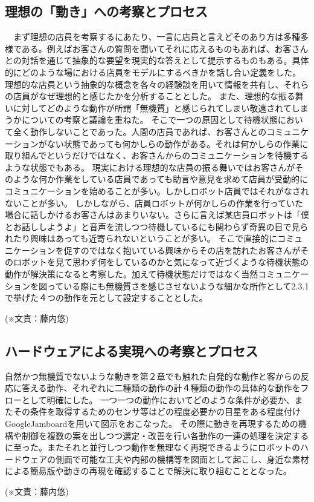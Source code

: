 \subsection{理想の「動き」への考察とプロセス}
　まず理想の店員を考察するにあたり、一言に店員と言えどそのあり方は多種多様である。例えばお客さんの質問を聞いてそれに応えるものもあれば、お客さんとの対話を通じて抽象的な要望を現実的な答えとして提示するものもある。具体的にどのような場における店員をモデルにするべきかを話し合い定義をした。
理想的な店員という抽象的な概念を各々の経験談を用いて情報を共有し、それらの店員がなぜ理想的と感じたかを分析することとした。
また、理想的な振る舞いに対してどのような動作が所謂「無機質」と感じられてしまい敬遠されてしまうかについての考察と議論を重ねた。
そこで一つの原因として待機状態において全く動作しないことであった。人間の店員であれば、お客さんとのコミュニケーションがない状態であっても何かしらの動作がある。それは何かしらの作業に取り組んでというだけではなく、お客さんからのコミュニケーションを待機するような状態でもある。
現実における理想的な店員の振る舞いではお客さんがそのような何か作業をしている店員であっても助言や意見を求めて店員が受動的にコミュニケーションを始めることが多い。しかしロボット店員ではそれがなされないことが多い。
しかしながら、店員ロボットが何かしらの作業を行っていた場合に話しかけるお客さんはあまりいない。さらに言えば某店員ロボットは「僕とお話ししようよ」と音声を流しつつ待機しているにも関わらず奇異の目で見られたり興味はあっても近寄られないということが多い。
そこで直接的にコミュニケーションを促すのではなく抱いている興味からその店を訪れたお客さんがそのロボットを見て思わず何をしているのかと気になって近づくような待機状態の動作が解決策になると考察した。加えて待機状態だけではなく当然コミュニケーションを図っている際にも無機質さを感じさせないような細かな所作として2.3.1で挙げた４つの動作を元として設定することとした。
\begin{flushright}
(※文責：藤内悠)
\end{flushright}
\subsection{ハードウェアによる実現への考察とプロセス}
自然かつ無機質でないような動きを第２章でも触れた自発的な動作と客からの反応に答える動作、それぞれに二種類の動作の計４種類の動作の具体的な動作をフローとして明確にした。
一つ一つの動作においてどのような条件が必要か、またその条件を取得するためのセンサ等はどの程度必要かの目星をある程度付けGoogleJamboardを用いて図示をおこなった。
その際に動きを再現するための機構や制御を複数の案を出しつつ選定・改善を行い各動作の一連の処理を決定するに至った。またそれと並行しつつ動作を無理なく再現できるようにロボットのハードウェアの側面で可能な工夫や内部の機構等を図面として起こし、身近な素材による簡易版や動きの再現を確認することで解決に取り組むこととなった。
\begin{flushright}
(※文責：藤内悠)
\end{flushright}
